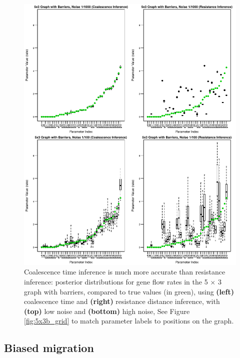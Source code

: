 \documentclass{article}
\begin{document}
\begin{figure}
\centering
     \includegraphics[scale=1]{figs/5x3b_post_coalvcom2}
    \caption{
        Coalescence time inference is much more accurate than resistance inference:
        posterior distributions for gene flow rates in the 5 $\times$ 3 graph with barriers,
        compared to true values (in green),
        using \textbf{(left)} coalescence time and \textbf{(right)} resistance distance inference,
        with \textbf{(top)} low noise and \textbf{(bottom)} high noise,
        See Figure \ref{fig:5x3b_grid} to match parameter labels to positions on the graph.
    \label{fig:5x3b_post_coalvcom}
}
\end{figure}


\subsection*{Biased migration}
\label{sec:biased_migration}
\end{document}
